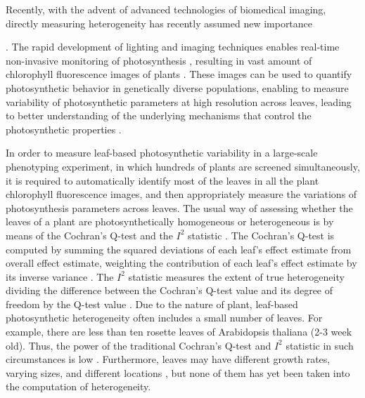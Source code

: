 \documentclass{bioinfo}
\begin{document}
Recently, with the advent of advanced technologies of biomedical imaging, directly measuring heterogeneity has recently assumed new importance {\citep{cruz2014depi,tiihonen1996cerebral,wieneke1999non,wang2000}. The rapid development of lighting and imaging techniques enables real-time non-invasive monitoring of photosynthesis \citep{cruz2014depi,houle2010phenomics}, resulting in vast amount of chlorophyll fluorescence images of plants \citep{wituszynska2013multivariable}. These images can be used to quantify photosynthetic behavior in genetically diverse populations, enabling to measure variability of photosynthetic parameters at high resolution across leaves, leading to better understanding of the underlying mechanisms that control the photosynthetic properties \citep{fiorani2013future,rascher2011non}.



In order to measure leaf-based photosynthetic variability in a large-scale phenotyping experiment, in which hundreds of plants are screened simultaneously, it is required to automatically identify most of the leaves in all the plant chlorophyll fluorescence images, and then appropriately measure the variations of photosynthesis parameters across leaves.
%
The usual way of assessing whether the leaves of a plant are photosynthetically homogeneous or heterogeneous is by means of the Cochran's Q-test \citep{conover1999Practical} and the $I^2$ statistic \citep{higgins2003measuring,higgins2002quantifying}. %
%
The Cochran's Q-test is computed by summing the squared deviations of each leaf's effect estimate from overall effect estimate, weighting the contribution of each leaf's effect estimate by its inverse variance \citep{conover1999Practical}.
%
The $I^2$ statistic measures the extent of true heterogeneity dividing the difference between the Cochran's Q-test value and its degree of freedom by the Q-test value \citep{higgins2003measuring,higgins2002quantifying}.
%
Due to the nature of plant, leaf-based photosynthetic heterogeneity often includes a small number of leaves. For example, there are less than ten rosette leaves of Arabidopsis thaliana (2-3 week old). Thus, the power of the traditional Cochran's Q-test and $I^2$ statistic in such circumstances is low \citep{higgins2003measuring, gavaghan2000evaluation,huedo2006assessing,ioannidis2007uncertainty}. Furthermore, leaves may have different growth rates, varying sizes, and different locations \citep{van1991insertional}, but none of them has yet been taken into the computation of heterogeneity.

}
\end{document}
